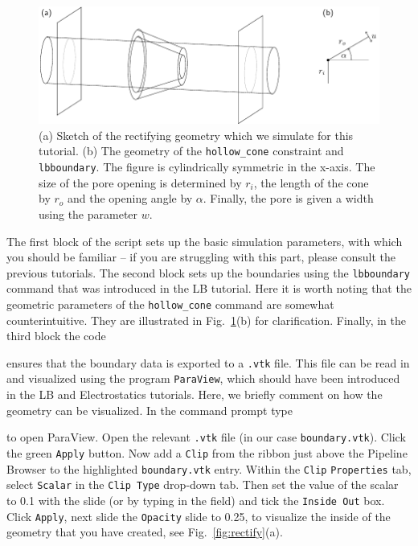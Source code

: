\documentclass[aip,jcp,reprint,a4paper,onecolumn,amsmath]{revtex4-1}
\newcommand\code{\lstinline}
\newcommand\codees{\lstinline[language=espresso]}
\begin{document}
\begin{figure}[!htb]
\begin{center}
\includegraphics[scale=1.0]{FIGURES/geometry}
\end{center}
\caption{\label{fig:system}(a) Sketch of the rectifying geometry which we simulate for this tutorial. (b) The geometry of the \codees{hollow_cone} constraint and \codees{lbboundary}. The figure is cylindrically symmetric in the x-axis. The size of the pore opening is determined by $r_{i}$, the length of the cone by $r_{o}$ and the opening angle by $\alpha$. Finally, the pore is given a width using the parameter $w$.}
\end{figure}

The first block of the script sets up the basic simulation parameters, with which you should be familiar -- if you are struggling with this part, please consult the previous tutorials. The second block sets up the boundaries using the \codees{lbboundary} command that was introduced in the LB tutorial. Here it is worth noting that the geometric parameters of the \codees{hollow_cone} command are somewhat counterintuitive. They are illustrated in Fig.~\ref{fig:system}(b) for clarification. Finally, in the third block the code
ensures that the boundary data is exported to a \codees{.vtk} file. This file can be read in and visualized using the program \code{ParaView}, which should have been introduced in the LB and Electrostatics tutorials. Here, we briefly comment on how the geometry can be visualized. In the command prompt type 
to open ParaView. Open the relevant \code{.vtk} file (in our case \code{boundary.vtk}). Click the green \code{Apply} button. Now add a \code{Clip} from the ribbon just above the Pipeline Browser to the highlighted \code{boundary.vtk} entry. Within the \code{Clip} \code{Properties} tab, select \code{Scalar} in the \code{Clip Type} drop-down tab. Then set the value of the scalar to 0.1 with the slide (or by typing in the field) and tick the \code{Inside Out} box. Click \code{Apply}, next slide the \code{Opacity} slide to 0.25, to visualize the inside of the geometry that you have created, see Fig.~\ref{fig:rectify}(a). 
\end{document}
